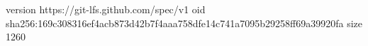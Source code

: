 version https://git-lfs.github.com/spec/v1
oid sha256:169c308316ef4acb873d42b7f4aaa758dfe14c741a7095b29258ff69a39920fa
size 1260
